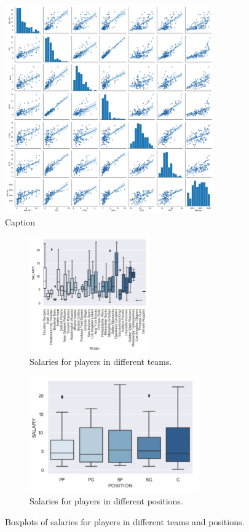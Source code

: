 \documentclass[letterpaper,12pt,twoside,]{pinp}
\begin{document}
\begin{figure}[H]
\includegraphics[width=0.8\textwidth]{scatter.png}
\caption{Caption}
\label{fig:figure2}
\end{figure}

\begin{figure}[H]
\begin{subfigure}{0.5\textwidth}
\includegraphics[width=0.9\linewidth, height=5cm]{team_box.png} 
\caption{Salaries for players in different teams.}
\label{fig:subim1}
\end{subfigure}
\begin{subfigure}{0.5\textwidth}
\includegraphics[width=0.9\linewidth, height=5cm]{position_box.png}
\caption{Salaries for players in different positions.}
\label{fig:subim2}
\end{subfigure}
\caption{Boxplots of salaries for players in different teams and positions.}
\end{figure}
\end{document}
